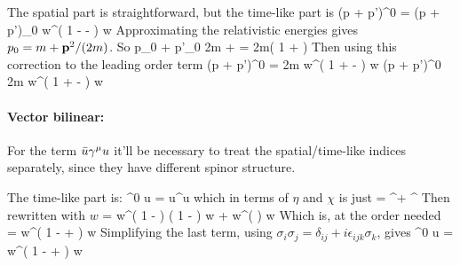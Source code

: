 The spatial part is straightforward, but the time-like part is 
\beq
	(p + p')^0 \srb \sr  = (p + p')_0 w^\dagger \left( 
		1 -   -  
		\right ) w
\eeq
Approximating the relativistic energies gives $p_0 = m + \mathbf{p}^2 / (2m) $.  So
\beq
	p_0 + p'_0 \approx 2m +  = 2m\left( 1 +   \right )
\eeq
Then using this correction to the leading order term
\beq
	(p + p')^0 \srb \sr  = 2m  w^\dagger \left( 
		1 +   -  
		\right ) w
\eeq
\beq \label{eq:Sh:S0}
	(p + p')^0 \srb \sr  \approx 2m  w^\dagger \left( 
		1 +   -  
		\right ) w
\eeq


\paragraph{Vector bilinear:}
For the term $\bar{u} \gamma^\mu u$ it'll be necessary to treat the spatial/time-like indices separately, since they have different spinor structure.

The time-like part is:
\beq
	\srb \gamma^0 u = u^\dagger u
\eeq
which in terms of $\eta$ and $\chi$ is just
\beq
	= \eta^\dagger \eta + \chi^\dagger \chi 
\eeq
Then rewritten with $w$
\beq
	= 	w^\dagger \left( 1 -  \right )  \left( 1 -  \right ) w
		+ w^\dagger \left(   \right ) w 
\eeq
Which is, at the order needed
\beq
	=	 w^\dagger \left( 
		1 -   +  
		\right ) w
\eeq
Simplifying the last term, using $\sigma_i \sigma_j = \delta_{ij} + i\epsilon_{ijk}\sigma_k$, gives
\beq \label{eq:Sh:V0}
	\srb \gamma^0 u = 
			w^\dagger \left( 
		1 -   +  
		\right ) w
\eeq





